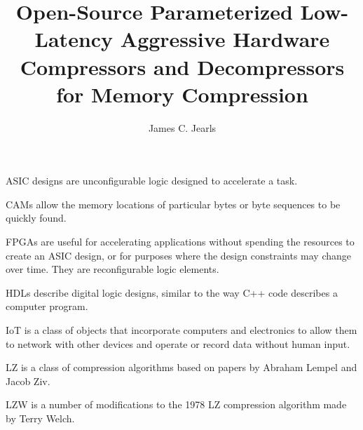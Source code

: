 \documentclass[doublespace,nopageskip]{VTthesis}
\title{Open-Source Parameterized Low-Latency Aggressive Hardware Compressors and Decompressors for Memory Compression}
\author{James C. Jearls}
\begin{document}
  \frontmatter
  \maketitle
  \tableofcontents

	\listoffigures
	\listoftables
    \printnomenclature %


ASIC designs are unconfigurable logic designed to accelerate a task.


CAMs allow the memory locations of particular bytes or byte sequences to be quickly found.


FPGAs are useful for accelerating applications without spending the resources to create an ASIC design, or for purposes where the design constraints may change over time. They are reconfigurable logic elements.


HDLs describe digital logic designs, similar to the way C++ code describes a computer program.


IoT is a class of objects that incorporate computers and electronics to allow them to network with other devices and operate or record data without human input.


LZ is a class of compression algorithms based on papers by Abraham Lempel and Jacob Ziv.
 
 
LZW is a number of modifications to the 1978 LZ compression algorithm made by Terry Welch.
 

\mainmatter
\end{document}

